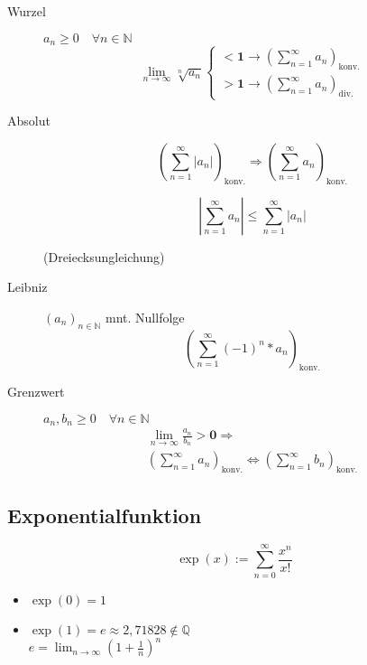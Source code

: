 \begin{mzImportant}
\begin{description}
    \item [Wurzel]
          $a_n \geq 0 \quad \forall n \in \mathbb{N}$
          $$
            \lim_{n \rightarrow \infty} \sqrt[n]{a_n} \begin{cases}
              \mathbf{< 1} \rightarrow (\sum_{n = 1}^\infty a_n)_\text{konv.} \\
              \mathbf{> 1} \rightarrow (\sum_{n = 1}^\infty a_n)_\text{div.}
            \end{cases}
          $$

    \item [Absolut]
          $$(\sum_{n=1}^\infty | a_n |)_\text{konv.} \Rightarrow (\sum_{n=1}^\infty a_n)_\text{konv.}$$

          $$| \sum_{n=1}^\infty a_n | \leq \sum_{n=1}^\infty | a_n |$$

          (Dreiecksungleichung)

    \item [Leibniz] $(a_n)_{n \in \mathbb{N}}$ mnt. Nullfolge
          $$(\sum_{n=1}^\infty (-1)^n * a_n)_\text{konv.}$$

    \item [Grenzwert] $a_n, b_n \geq 0 \quad \forall n \in \mathbb{N}$
          \begin{gather*}
            \lim_{n \rightarrow \infty} \frac{a_n}{b_n} \mathbf{> 0} \Rightarrow \\
            (\sum_{n=1}^\infty a_n)_\text{konv.} \Leftrightarrow (\sum_{n=1}^\infty b_n)_\text{konv.}
          \end{gather*}
  \end{description}
\end{mzImportant}


\subsection{Exponentialfunktion}

\begin{mzImportant}
  $$\exp(x) := \sum_{n = 0}^\infty \frac{x^n}{x!}$$
\end{mzImportant}

\begin{itemize}
  \item $\exp(0) = 1$
  \item
        $\exp(1) = e \approx 2,71828 \notin \mathbb{Q}$ \\
        $e = \lim_{n \rightarrow \infty} (1 + \frac{1}{n})^n$
\end{itemize}

